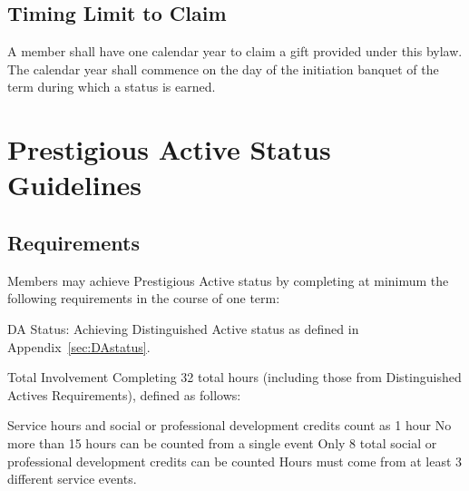 \section{Timing Limit to Claim}
A member shall have one calendar year to claim a gift provided under this bylaw.
The calendar year shall commence on the day of the initiation banquet of the term during which a status is earned.

\chapter{Prestigious Active Status Guidelines}\label{sec:PAstatus}
\section{Requirements}
Members may achieve Prestigious Active status by completing at minimum the following requirements in the course of one term:
\begin{enumsubsection}
\item{DA Status:}
Achieving Distinguished Active status as defined in Appendix~\ref{sec:DAstatus}.
\item{Total Involvement}
Completing 32 total hours (including those from Distinguished Actives Requirements), defined as follows:
\begin{compactenum}[1.]
\itemnotoc Service hours and social or professional development credits count as 1 hour
\itemnotoc No more than 15 hours can be counted from a single event
\itemnotoc Only 8 total social or professional development credits can be counted
\itemnotoc Hours must come from at least 3 different service events.
\end{compactenum}
\end{enumsubsection}
